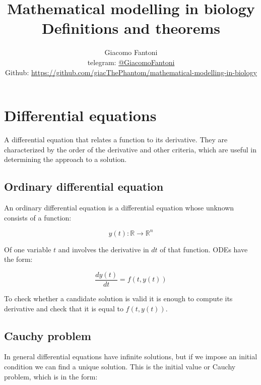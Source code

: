 

\title{\Huge\textbf{{Mathematical modelling in biology}}\\\LARGE Definitions and theorems}

\author{
  Giacomo Fantoni \\
  \small telegram: \href{https://t.me/GiacomoFantoni}{@GiacomoFantoni} \\[3pt]
  \small Github: \href{https://github.com/giacThePhantom/mathematical-modelling-in-biology}{https://github.com/giacThePhantom/mathematical-modelling-in-biology}\\
}




  \maketitle
  \tableofcontents

\section{Differential equations}
A differential equation that relates a function to its derivative.
They are characterized by the order of the derivative and other criteria, which are useful in determining the approach to a solution.

  \subsection{Ordinary differential equation}
  An ordinary differential equation is a differential equation whose unknown consists of a function:

  $$y(t): \mathbb{R}\rightarrow\mathbb{R}^n$$

  Of one variable $t$ and involves the derivative in $dt$ of that function.
  ODEs have the form:

  $$\frac{dy(t)}{dt} = f(t, y(t))$$

  To check whether a candidate solution is valid it is enough to compute its derivative and check that it is equal to $f(t, y(t))$.

  \subsection{Cauchy problem}
  In general differential equations have infinite solutions, but if we impose an initial condition we can find a unique solution.
  This is the initial value or Cauchy problem, which is in the form:

